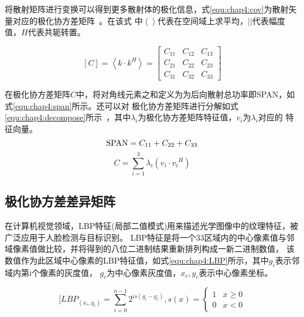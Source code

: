     将散射矩阵进行变换可以得到更多散射体的极化信息，式\ref{equ:chap4:cov}为散射矢量对应的极化协方差矩阵~\cite{Zhang2018Ship}。在该式
    中$\left\langle {} \right\rangle$代表在空间域上求平均，$\left| {} \right|$代表幅度值，$H$代表共轭转置。

    \begin{equation}
        \label{equ:chap4:cov}
        [C] = \left\langle {k \cdot {k^H}} \right\rangle  = \left[ {\begin{array}{*{20}{c}}
        {{C_{11}}}&{{C_{12}}}&{{C_{13}}}\\
        {{C_{21}}}&{{C_{22}}}&{{C_{23}}}\\
        {{C_{31}}}&{{C_{32}}}&{{C_{33}}}
        \end{array}} \right]
    \end{equation}

    在极化协方差矩阵$C$中，将对角线元素之和定义为为后向散射总功率即SPAN，如式\ref{equ:chap4:span}所示。还可以对
    极化协方差矩阵进行分解如式\ref{equ:chap4:decompose}所示~\cite{Liu2010Statistical}，其中$\lambda_i$为极化协方差矩阵特征值，$v_i$为$\lambda_i$对应的
    特征向量。
    \begin{equation}
        \label{equ:chap4:span}
        {\rm{SPAN}} = {C_{11}} + {C_{22}} + {C_{33}}
    \end{equation}
    \begin{equation}
        \label{equ:chap4:decompose}
      C = \sum\limits_{i = 1}^3 {{\lambda _i}({v_i} \cdot {v_i}^H)} 
    \end{equation}

    \subsection{极化协方差差异矩阵}
    在计算机视觉领域，LBP特征(局部二值模式)用来描述光学图像中的纹理特征，被广泛应用于人脸检测与目标识别。
    LBP特征是将一个3\times 3区域内的中心像素值与邻域像素值做比较，并将得到的八位二进制结果重新排列构成一新二进制数值，
    该数值作为此区域中心像素的LBP特征值，如式\ref{equ:chap4:LBP}所示，其中$g_i$表示邻域内第i个像素的灰度值，
    $g_c$为中心像素灰度值，$x_c, y_c$表示中心像素坐标。

    \begin{equation}
        \label{equ:chap4:LBP}
        [LB{P_{({x_c},{y_c})}} = \sum\limits_{i = 0}^{n - 1} {{2^{is({g_i} - {g_c})}}} ,s(x) = \left\{ {\begin{array}{*{20}{c}}
        1&{x \ge 0}\\
        0&{x < 0}
        \end{array}} \right.
    \end{equation}

